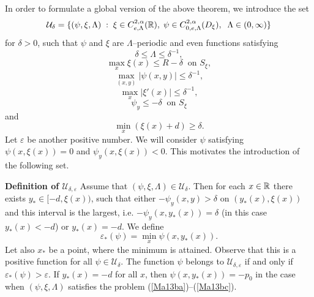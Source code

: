 \documentclass[a4paper,reqno,12pt]{amsart}
\theoremstyle{plain}
\theoremstyle{definition}
\numberwithin{equation}{section}
\begin{document}
In order to formulate a global version of the above theorem,  we introduce the set
\begin{equation}\label{A30ac}
{\mathcal U}_\delta =\{(\psi,\xi,\Lambda)\;:\;\xi\in C^{2,\alpha}_{e,\Lambda}(\Bbb R),\;
\psi\in C^{2,\alpha}_{0,e,\Lambda}(D_\xi),\;\;\Lambda\in (0,\infty)\}
\end{equation}
for $\delta >0$,
such that $\psi$ and $\xi$ are $\Lambda$--periodic and even functions satisfying
\begin{equation}\label{A30aaa}
\delta\leq\Lambda\leq\delta^{-1},
\end{equation}
\begin{equation}\label{A30ab}
\max_x\xi(x)\leq R-\delta\;\;\mbox{on $S_\xi$},
\end{equation}
\begin{equation}\label{A30a}
\max_{(x,y)} |\psi(x,y)|\leq \delta^{-1},
\end{equation}
\begin{equation}\label{A30aa}
\max_x|\xi'(x)|\leq \delta^{-1},
\end{equation}
\begin{equation}\label{Ma1a}
\psi_y\leq -\delta\;\;\mbox{on $S_\xi$}
\end{equation}
and
\begin{equation}\label{A30ad}
\min_x (\xi(x)+d)\geq \delta.
\end{equation}
Let $\varepsilon$ be another positive number. We will consider $\psi$ satisfying $\psi(x,\xi(x))=0$ and $\psi_y(x,\xi(x))<0$. This motivates the introduction of the following set.

\noindent
{\bf Definition of ${\mathcal U}_{\delta,\varepsilon}$}\label{Ma30a} Assume that $(\psi,\xi,\Lambda)\in {\mathcal U}_\delta$. Then for each $x\in\Bbb R$ there exists $y_*\in [-d,\xi(x))$, such that either $-\psi_y(x,y)>\delta$ on $(y_*(x),\xi(x))$ and this interval is the largest, i.e. $-\psi_y(x,y_*(x))=\delta$ (in this case $y_*(x)<-d$) or $y_*(x)=-d$. We define
\begin{equation}\label{Jun10a}
\varepsilon_*(\psi)=\min_x \psi(x,y_*(x)).
\end{equation}
Let also $x_*$ be a point, where the minimum is attained.
Observe that this is a positive function for all $\psi\in{\mathcal U}_\delta$.
 The function $\psi$ belongs to ${\mathcal U}_{\delta,\varepsilon}$ if and only if $\varepsilon_*(\psi)>\varepsilon$. If $y_*(x)=-d$ for all $x$, then $\psi(x,y_*(x))=-p_0$ in the case when $(\psi,\xi,\Lambda)$ satisfies the problem (\ref{Ma13ba})--(\ref{Ma13bc}).
\end{document}
